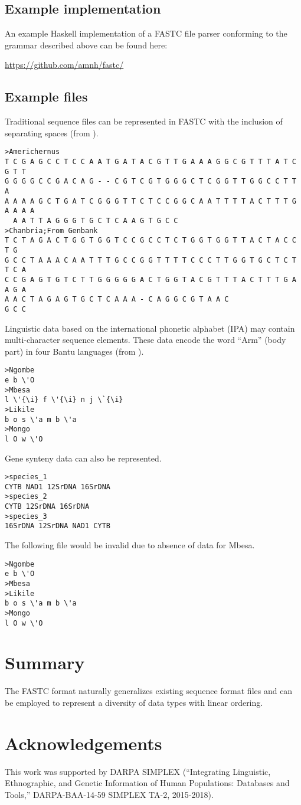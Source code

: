 \documentclass[12pt]{article}
\begin{document}
\subsection{Example implementation}

An example Haskell implementation of a FASTC file parser conforming to the grammar described above can be found here:

\url{https://github.com/amnh/fastc/}


\subsection{Example files}
Traditional sequence files can be represented in FASTC with the inclusion of separating spaces (from \citealp{Wheeler1998c}).
\singlespace
\begin{verbatim}
>Americhernus      
T C G A G C C T C C A A T G A T A C G T T G A A A G G C G T T T A T C G T T 
G G G G C C G A C A G - - C G T C G T G G G C T C G G T T G G C C T T A 
A A A A G C T G A T C G G G T T C T C C G G C A A T T T T A C T T T G A A A A
  A A T T A G G G T G C T C A A G T G C C 
>Chanbria;From Genbank
T C T A G A C T G G T G G T C C G C C T C T G G T G G T T A C T A C C T G 
G C C T A A A C A A T T T G C C G G T T T T C C C T T G G T G C T C T T C A 
C C G A G T G T C T T G G G G G A C T G G T A C G T T T A C T T T G A A G A 
A A C T A G A G T G C T C A A A - C A G G C G T A A C
G C C 
\end{verbatim}
 \doublespace
Linguistic data based on the international phonetic alphabet (IPA) may contain multi-character sequence elements.
These data encode the word ``Arm'' (body part) in four Bantu languages (from \citealp{Whiteleyetal2019}).  
\singlespace
\begin{verbatim}
>Ngombe
e b \'O
>Mbesa
l \'{\i} f \'{\i} n j \`{\i}
>Likile
b o s \'a m b \'a
>Mongo
l O w \'O
\end{verbatim}
Gene synteny data can also be represented.
\begin{verbatim}
>species_1
CYTB NAD1 12SrDNA 16SrDNA
>species_2
CYTB 12SrDNA 16SrDNA
>species_3
16SrDNA 12SrDNA NAD1 CYTB
\end{verbatim}

The following file would be invalid due to absence of data for Mbesa.

\begin{verbatim}
>Ngombe
e b \'O
>Mbesa
>Likile
b o s \'a m b \'a
>Mongo
l O w \'O
\end{verbatim}
\doublespace
\section{Summary}
The FASTC format naturally generalizes existing sequence format files and can be employed to
represent a diversity of
data types with linear ordering.

\section{Acknowledgements}
This work was supported by DARPA SIMPLEX (``Integrating Linguistic, Ethnographic, and Genetic Information of Human Populations: Databases and Tools,'' DARPA-BAA-14-59 SIMPLEX TA-2, 2015-2018). 
\newpage

\end{document}
